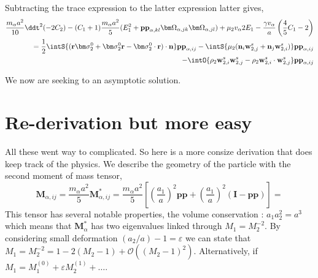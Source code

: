 Subtracting the trace expression to the latter expression latter gives, 
\begin{align*}
    \frac{m_\alpha a^2}{10}\ddt^2 (-2C_2)
    - (C_1 + 1) \frac{m_\alpha a^2}{5}(
         E_1^2
        + \textbf{pp}_{\alpha,kl}\bm\Omega_{\alpha,jk}\bm\Omega_{\alpha,jl})
    + \mu_2 v_\alpha 2 E_1
    - \frac{ \gamma v_\alpha }{ a} \left(\frac{4}{5}
        C_1
        -2 
    \right)\nonumber\\
    = \frac{1}{2}\intS{(\textbf{r}\bm\sigma_2^0+ \bm\sigma_2^0\textbf{r}- \bm\sigma_2^0\cdot \textbf{r})\cdot \textbf{n}}\textbf{pp}_{\alpha,ij}
    - \intS{\mu_2 (\textbf{n}_i \textbf{w}_{2,j}^s + \textbf{n}_j \textbf{w}_{2,i}^s)}\textbf{pp}_{\alpha,ij}\\
    - \intO{\rho_2 \textbf{w}_{2,i}^s\textbf{w}_{2,j}^s-\rho_2 \textbf{w}_{2,i}^s\cdot\textbf{w}_{2,j}^s} \textbf{pp}_{\alpha,ij}
\end{align*}



We now are seeking to an asymptotic solution. 



\section*{Re-derivation but more easy}
All these went way to complicated. 
So here is a more consize derivation that does keep track of the physics. 
We describe the geometry of the particle with the second moment of mass tensor, 
\begin{equation*}
    \textbf{M}_{\alpha,ij} 
    =\frac{m_\alpha a^2}{5} \textbf{M}_{\alpha,ij}^*
    = \frac{m_\alpha a^2}{5}\left[
        \left(
            \frac{a_1}{a}
        \right)^2\textbf{pp}
        + 
        \left(
            \frac{a_1}{a}
        \right)^2(\textbf{I}- \textbf{pp})
    \right]
    = 
\end{equation*}
This tensor has several notable properties, the volume conservation : $a_1 a_2^2 = a^3$ which means that $\textbf{M}_\alpha^*$ has two eigenvalues linked through $M_1 = M_2^{-2}$. 
By considering small deformation $(a_2/a) - 1= \varepsilon$ we can state that $M_1 = M_2^{-2} = 1 - 2 (M_2 - 1 ) + \mathcal{O}((M_2-1)^2)$. 
Alternatively, if $M_1 = M_1^(0) + \varepsilon M_2^(1) + \ldots$. 


